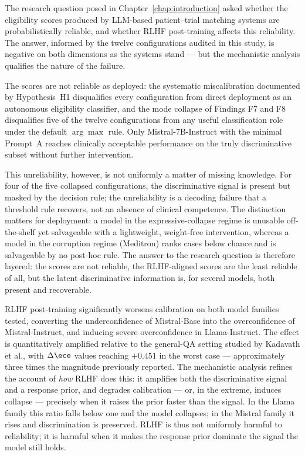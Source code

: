 The research question posed in Chapter~\ref{chap:introduction} asked 
whether the eligibility scores produced by LLM-based patient--trial 
matching systems are probabilistically reliable, and whether RLHF 
post-training affects this reliability. The answer, informed by the 
twelve configurations audited in this study, is negative on both 
dimensions as the systems stand --- but the mechanistic analysis 
qualifies the nature of the failure.

The scores are not reliable as deployed: the systematic miscalibration 
documented by Hypothesis~H1 disqualifies every configuration from direct 
deployment as an autonomous eligibility classifier, and the mode 
collapse of Findings F7 and F8 disqualifies five of the twelve 
configurations from any useful classification role under the default 
$\arg\max$ rule. Only Mistral-7B-Instruct with the minimal Prompt~A 
reaches clinically acceptable performance on the truly discriminative 
subset without further intervention.

This unreliability, however, is not uniformly a matter of missing 
knowledge. For four of the five collapsed configurations, the 
discriminative signal is present but masked by the decision rule; the 
unreliability is a decoding failure that a threshold rule recovers, not 
an absence of clinical competence. The distinction matters for 
deployment: a model in the expressive-collapse regime is unusable 
off-the-shelf yet salvageable with a lightweight, weight-free 
intervention, whereas a model in the corruption regime (Meditron) ranks 
cases below chance and is salvageable by no post-hoc rule. The answer to 
the research question is therefore layered: the scores are not reliable, 
the RLHF-aligned scores are the least reliable of all, but the latent 
discriminative information is, for several models, both present and 
recoverable.

RLHF post-training significantly worsens calibration on both model 
families tested, converting the underconfidence of Mistral-Base into 
the overconfidence of Mistral-Instruct, and inducing severe 
overconfidence in Llama-Instruct. The effect is quantitatively 
amplified relative to the general-QA setting studied by Kadavath 
et al., with $\Delta\ece$ values reaching $+0.451$ in the worst case 
--- approximately three times the magnitude previously reported. The 
mechanistic analysis refines the account of \emph{how} RLHF does this: 
it amplifies both the discriminative signal and a response prior, and 
degrades calibration --- or, in the extreme, induces collapse --- 
precisely when it raises the prior faster than the signal. In the Llama 
family this ratio falls below one and the model collapses; in the 
Mistral family it rises and discrimination is preserved. RLHF is thus 
not uniformly harmful to reliability; it is harmful when it makes the 
response prior dominate the signal the model still holds.

